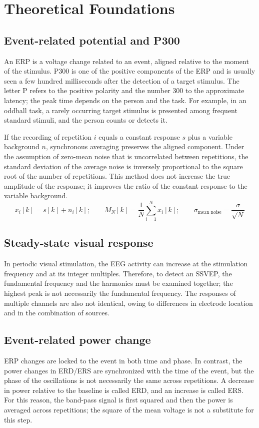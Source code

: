 \section{Theoretical Foundations}

\subsection*{Event-related potential and P300}

An ERP is a voltage change related to an event, aligned relative to the moment of the stimulus. P300 is one of the positive components of the ERP and is usually seen a few hundred milliseconds after the detection of a target stimulus. The letter P refers to the positive polarity and the number 300 to the approximate latency; the peak time depends on the person and the task. For example, in an oddball task, a rarely occurring target stimulus is presented among frequent standard stimuli, and the person counts or detects it.

If the recording of repetition $i$ equals a constant response $s$ plus a variable background $n$, synchronous averaging preserves the aligned component. Under the assumption of zero-mean noise that is uncorrelated between repetitions, the standard deviation of the average noise is inversely proportional to the square root of the number of repetitions. This method does not increase the true amplitude of the response; it improves the ratio of the constant response to the variable background.
\begin{equation}
x_i[k]=s[k]+n_i[k];\qquad
M_N[k]=\frac{1}{N}\sum_{i=1}^{N}x_i[k];\qquad
\sigma_{\text{mean noise}}=\frac{\sigma}{\sqrt{N}}
\end{equation}

\subsection*{Steady-state visual response}

In periodic visual stimulation, the EEG activity can increase at the stimulation frequency and at its integer multiples. Therefore, to detect an SSVEP, the fundamental frequency and the harmonics must be examined together; the highest peak is not necessarily the fundamental frequency. The responses of multiple channels are also not identical, owing to differences in electrode location and in the combination of sources.

\subsection*{Event-related power change}

ERP changes are locked to the event in both time and phase. In contrast, the power changes in ERD/ERS are synchronized with the time of the event, but the phase of the oscillations is not necessarily the same across repetitions. A decrease in power relative to the baseline is called ERD, and an increase is called ERS. For this reason, the band-pass signal is first squared and then the power is averaged across repetitions; the square of the mean voltage is not a substitute for this step.
